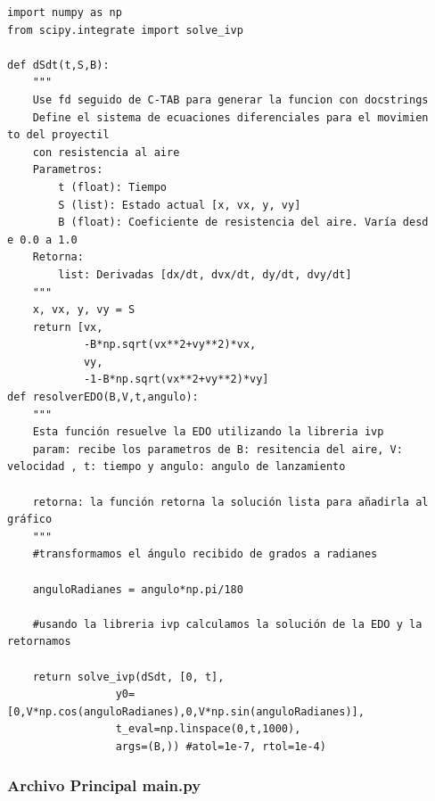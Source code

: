 \documentclass{article}
\begin{document}
\begin{verbatim}
import numpy as np
from scipy.integrate import solve_ivp

def dSdt(t,S,B):
    """
    Use fd seguido de C-TAB para generar la funcion con docstrings
    Define el sistema de ecuaciones diferenciales para el movimien    to del proyectil
    con resistencia al aire
    Parametros:
        t (float): Tiempo
        S (list): Estado actual [x, vx, y, vy]
        B (float): Coeficiente de resistencia del aire. Varía desd        e 0.0 a 1.0
    Retorna:
        list: Derivadas [dx/dt, dvx/dt, dy/dt, dvy/dt]
    """
    x, vx, y, vy = S
    return [vx,
            -B*np.sqrt(vx**2+vy**2)*vx,
            vy,
            -1-B*np.sqrt(vx**2+vy**2)*vy]
def resolverEDO(B,V,t,angulo):
    """
    Esta función resuelve la EDO utilizando la libreria ivp
    param: recibe los parametros de B: resitencia del aire, V: velocidad , t: tiempo y angulo: angulo de lanzamiento

    retorna: la función retorna la solución lista para añadirla al gráfico
    """
    #transformamos el ángulo recibido de grados a radianes

    anguloRadianes = angulo*np.pi/180

    #usando la libreria ivp calculamos la solución de la EDO y la retornamos

    return solve_ivp(dSdt, [0, t],
                 y0=[0,V*np.cos(anguloRadianes),0,V*np.sin(anguloRadianes)],
                 t_eval=np.linspace(0,t,1000),
                 args=(B,)) #atol=1e-7, rtol=1e-4)

\end{verbatim}
\subsubsection{Archivo Principal main.py}
\label{sec:org37e3c6e}
\end{document}
